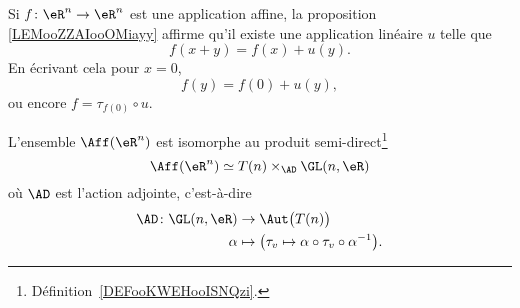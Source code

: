 Si \( f\colon \eR^n\to \eR^n\) est une application affine, la proposition \ref{LEMooZZAIooOMiayy} affirme qu'il existe une application linéaire \( u\) telle que
\begin{equation}
	f(x+y)=f(x)+u(y).
\end{equation}
En écrivant cela pour \( x=0\),
\begin{equation}
	f(y)=f(0)+u(y),
\end{equation}
ou encore \( f=\tau_{f(0)}\circ u\).

\begin{proposition}  \label{PROPooTPFZooKtFxhg}
	L'ensemble \( \Aff(\eR^n)\) est isomorphe au produit semi-direct\footnote{Définition~\ref{DEFooKWEHooISNQzi}.}
	\begin{equation}
		\Aff(\eR^n)\simeq  T(n)\times_{\AD}\GL(n,\eR)
	\end{equation}
	où \( \AD\) est l'action adjointe, c'est-à-dire
	\begin{equation}
		\begin{aligned}
			\AD\colon \GL(n,\eR) & \to \Aut\big( T(n) \big)                                           \\
			\alpha               & \mapsto\big( \tau_v\mapsto \alpha\circ\tau_v\circ\alpha^{-1}\big).
		\end{aligned}
	\end{equation}
\end{proposition}


